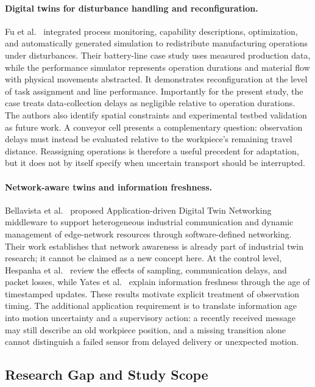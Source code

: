 \paragraph{Digital twins for disturbance handling and reconfiguration.}
Fu et al.~\cite{Fu2025} integrated process monitoring, capability descriptions, optimization, and automatically generated simulation to redistribute manufacturing operations under disturbances. Their battery-line case study uses measured production data, while the performance simulator represents operation durations and material flow with physical movements abstracted. It demonstrates reconfiguration at the level of task assignment and line performance. Importantly for the present study, the case treats data-collection delays as negligible relative to operation durations. The authors also identify spatial constraints and experimental testbed validation as future work. A conveyor cell presents a complementary question: observation delays must instead be evaluated relative to the workpiece's remaining travel distance. Reassigning operations is therefore a useful precedent for adaptation, but it does not by itself specify when uncertain transport should be interrupted.

\paragraph{Network-aware twins and information freshness.}
Bellavista et al.~\cite{Bellavista2021} proposed Application-driven Digital Twin Networking middleware to support heterogeneous industrial communication and dynamic management of edge-network resources through software-defined networking. Their work establishes that network awareness is already part of industrial twin research; it cannot be claimed as a new concept here. At the control level, Hespanha et al.~\cite{Hespanha2007} review the effects of sampling, communication delays, and packet losses, while Yates et al.~\cite{Yates2021} explain information freshness through the age of timestamped updates. These results motivate explicit treatment of observation timing. The additional application requirement is to translate information age into motion uncertainty and a supervisory action: a recently received message may still describe an old workpiece position, and a missing transition alone cannot distinguish a failed sensor from delayed delivery or unexpected motion.

\subsection{Research Gap and Study Scope}

